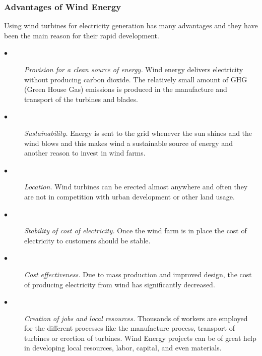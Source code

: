 \documentclass[twosided,a4,10pt]{article}
\begin{document}
\begin{multicols}{2}
 \subsubsection{Advantages of Wind Energy}
 Using wind turbines for electricity generation has many advantages and they have been the main reason for their rapid development.
 \begin{description}
 	\item[$\bullet$]
 	 \textit{Provision for a clean source of energy.} Wind energy delivers electricity without producing carbon dioxide. The relatively small amount of GHG (Green House Gas) emissions is produced in the manufacture and transport of the turbines and blades.
 	\item[$\bullet$] \textit{Sustainability.} Energy is sent to the grid whenever the sun shines and the wind blows and this makes wind a sustainable source of energy and another reason to invest in wind farms.
 	\item[$\bullet$] \textit{Location.} Wind turbines can be erected almost anywhere and often they are not in competition with urban development or other land usage.
 	\item[$\bullet$]
 	\textit{Stability of cost of electricity.} Once the wind farm is in place the cost of electricity to customers should be stable.
 	\item[$\bullet$]
 	\textit{Cost effectiveness.} Due to mass production and improved design, the cost of producing electricity from wind has significantly decreased.
 	\item[$\bullet$]
 	\textit{Creation of jobs and local resources.} Thousands of workers are employed for the different processes like the manufacture process, transport of turbines or erection of turbines. Wind Energy projects can be of great help in developing local resources, labor, capital, and even materials.
 \end{description}
 

\end{multicols}
\end{document}

